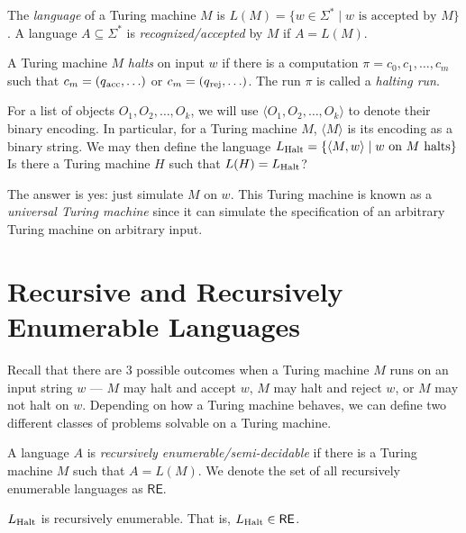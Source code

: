 \documentclass[11pt,usenames, dvipsnames]{article}
\begin{document}
\begin{definition}
  The \emph{language} of a Turing machine $M$ is $L(M) = \{w \in \Sigma^* \mid w \text{ is accepted by $M$}\}$. A language $A \subseteq \Sigma^*$ is \emph{recognized/accepted} by $M$ if $A = L(M)$.
\end{definition}

\begin{definition}[Halting]
  A Turing machine $M$ \emph{halts} on input $w$ if there is a computation $\pi = c_0, c_1, \ldots, c_m$ such that $c_m = (q\textsubscript{acc}, \ldots)$ or $c_m = (q\textsubscript{rej}, \ldots)$. The run $\pi$ is called a \emph{halting run}.
\end{definition}

For a list of objects $O_1, O_2, \ldots, O_k$, we will use $\langle O_1, O_2, \ldots, O_k \rangle$ to denote their binary encoding. In particular, for a Turing machine $M$, $\langle M \rangle$ is its encoding as a binary string. We may then define the language $L\textsubscript{Halt} = \{\langle M, w \rangle \mid w \text{ on } M \text{ halts}\}$ Is there a Turing machine $H$ such that $L(H) = L\textsubscript{Halt}$?

The answer is yes: just simulate $M$ on $w$. This Turing machine is known as a \emph{universal Turing machine} since it can simulate the specification of an arbitrary Turing machine on arbitrary input.

\section*{\large \centering Recursive and Recursively Enumerable Languages}
\noindent

Recall that there are $3$ possible outcomes when a Turing machine $M$ runs on an input string $w$ --- $M$ may halt and accept $w$, $M$ may halt and reject $w$, or $M$ may not halt on $w$. Depending on how a Turing machine behaves,  we can define two different classes of problems solvable on a Turing machine.

\begin{definition}
  A language $A$ is \emph{recursively enumerable/semi-decidable} if there is a Turing machine $M$ such that $A = L(M)$. We denote the set of all recursively enumerable languages as $\textsf{RE}$.
\end{definition}

\begin{example}
  $L\textsubscript{Halt}$ is recursively enumerable. That is, $L\textsubscript{Halt} \in \textsf{RE}$.
\end{example}
\end{document}
